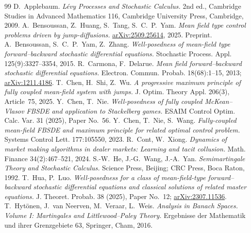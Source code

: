 \begin{thebibliography}{99}
 D.~Applebaum.
  \emph{L\'evy Processes and Stochastic Calculus.} 2nd ed., Cambridge Studies in Advanced
  Mathematics 116, Cambridge University Press, Cambridge, 2009.
 A.~Bensoussan, Z.~Huang, S.~Tang, S.~C.~P.~Yam.
  \emph{Mean field type control problems driven by jump-diffusions.}
  \href{https://arxiv.org/abs/2509.25614}{arXiv:2509.25614}, 2025. Preprint.
 A.~Bensoussan, S.~C.~P.~Yam, Z.~Zhang.
  \emph{Well-posedness of mean-field type forward--backward stochastic differential
  equations.} Stochastic Process. Appl. 125(9):3327--3354, 2015.
 R.~Carmona, F.~Delarue.
  \emph{Mean field forward--backward stochastic differential equations.}
  Electron. Commun. Probab. 18(68):1--15, 2013;
  \href{https://arxiv.org/abs/1211.4186}{arXiv:1211.4186}.
 T.~Chen, H.~Shi, Z.~Wu.
  \emph{A progressive maximum principle of fully coupled mean-field system with jumps.}
  J. Optim. Theory Appl. 206(3), Article~75, 2025.
 Y.~Chen, T.~Nie.
  \emph{Well-posedness of fully coupled McKean--Vlasov FBSDE and application to
  Stackelberg games.} ESAIM Control Optim. Calc. Var. 31 (2025), Paper No.~56.
 Y.~Chen, T.~Nie, S.~Wang.
  \emph{Fully-coupled mean-field FBSDE and maximum principle for related optimal
  control problem.} Systems Control Lett. 177:105550, 2023.
 R.~Cont, W.~Xiong.
  \emph{Dynamics of market making algorithms in dealer markets: Learning and tacit
  collusion.} Math. Finance 34(2):467--521, 2024.
 S.-W.~He, J.-G.~Wang, J.-A.~Yan.
  \emph{Semimartingale Theory and Stochastic Calculus.} Science Press, Beijing; CRC
  Press, Boca Raton, 1992.
 T.~Hua, P.~Luo.
  \emph{Well-posedness for a class of mean-field-type forward--backward stochastic
  differential equations and classical solutions of related master equations.}
  J. Theoret. Probab. 38 (2025), Paper No.~12;
  \href{https://arxiv.org/abs/2307.11536}{arXiv:2307.11536}.
 T.~Hyt\"onen, J.~van Neerven, M.~Veraar, L.~Weis.
  \emph{Analysis in Banach Spaces. Volume I: Martingales and Littlewood--Paley Theory.}
  Ergebnisse der Mathematik und ihrer Grenzgebiete 63, Springer, Cham,
  2016.

\end{thebibliography}
